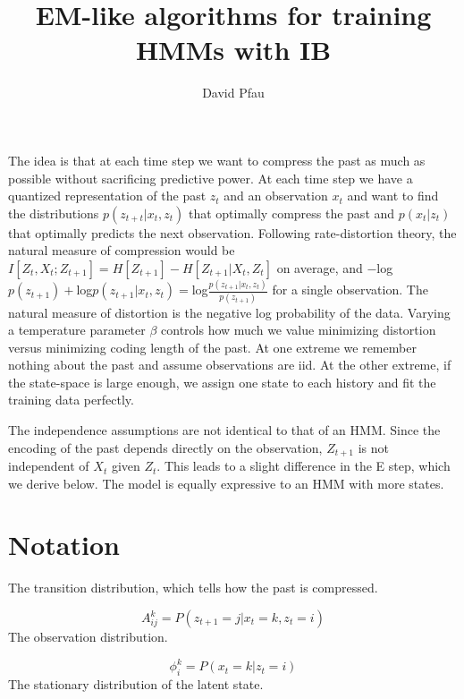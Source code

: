 \documentclass[11pt]{article}
\title{EM-like algorithms for training HMMs with IB}
\author{David Pfau}
\begin{document}
\maketitle

The idea is that at each time step we want to compress the past as much as possible without sacrificing predictive power.  At each time step we have a quantized representation of the past $z_t$ and an observation $x_t$ and want to find the distributions $p(z_{t+t}|x_t,z_t)$ that optimally compress the past and $p(x_t|z_t)$ that optimally predicts the next observation.  Following rate-distortion theory, the natural measure of compression would be $I[Z_t,X_t;Z_{t+1}] = H[Z_{t+1}] - H[Z_{t+1}|X_t,Z_t]$ on average, and $-$log$p(z_{t+1}) + $log$p(z_{t+1}|x_t,z_t) = $log$\frac{p(z_{t+1}|x_t,z_t)}{p(z_{t+1})}$ for a single observation.  The natural measure of distortion is the negative log probability of the data.  Varying a temperature parameter $\beta$ controls how much we value minimizing distortion versus minimizing coding length of the past.  At one extreme we remember nothing about the past and assume observations are iid.  At the other extreme, if the state-space is large enough, we assign one state to each history and fit the training data perfectly.

The independence assumptions are not identical to that of an HMM.  Since the encoding of the past depends directly on the observation, $Z_{t+1}$ is not independent of $X_t$ given $Z_t$.  This leads to a slight difference in the E step, which we derive below.  The model is equally expressive to an HMM with more states.

\section{Notation}

The transition distribution, which tells how the past is compressed.

\[
A^{k}_{ij} = P(z_{t+1} = j | x_t = k, z_t = i)
\]
The observation distribution.

\[
\phi^k_i = P(x_t = k | z_t = i)
\]
The stationary distribution of the latent state.
\end{document}

